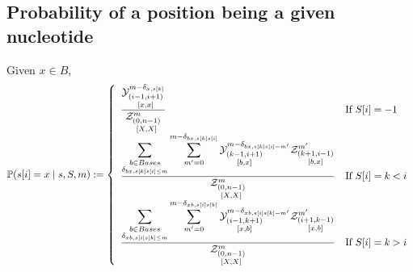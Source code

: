 \subsection{Probability of a position being a given nucleotide}
Given $x\in B$,
$$
	\mathbb{P}(s[i] = x\mid s, S,m):=\left\{
	\begin{array}{ll}
		\displaystyle
		\frac{
			\Y{i-1,i+1}{m-\Kron_{x,s[k]}}{x,x}
		}{
			\Z{0,n-1}{m}{X,X}
		}
		&\text{If }S[i] = -1\\
		\displaystyle
 		\frac{
			\displaystyle
			\sum_{\substack{b\in Bases\\\Kron_{bx,s[k]s[i]\leq m}}}
			\sum_{m'=0}^{m-\Kron_{bx,s[k]s[i]}}
			\Y{k-1,i+1}{m-\Kron_{bx,s[k]s[i]-m'}}{b,x}
			\Z{k+1,i-1}{m'}{b,x}
		}{
			\Z{0,n-1}{m}{X,X}
		}
		&\text{If }S[i]=k<i\\
		\displaystyle
		\frac{
			\displaystyle
			\sum_{\substack{b\in Bases\\\Kron_{xb,s[i]s[k]\leq m}}}
			\sum_{m'=0}^{m-\Kron_{xb,s[i]s[k]}}
			\Y{i-1,k+1}{m-\Kron_{xb,s[i]s[k]-m'}}{x,b}
			\Z{i+1,k-1}{m'}{x,b}
		}{
			\Z{0,n-1}{m}{X,X}
		}
		&\text{If }S[i]=k>i
	\end{array}\right.
$$
